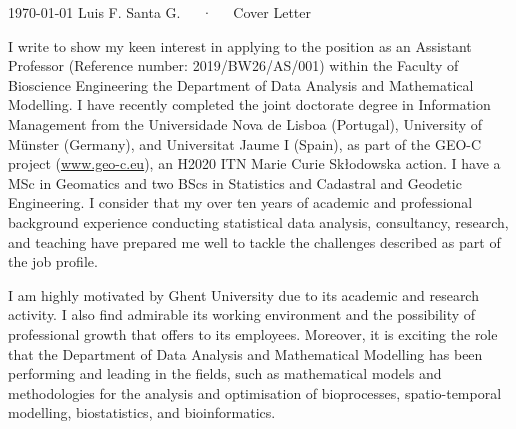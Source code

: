 \documentclass[11pt, a4paper]{awesome-cv}
\begin{document}
\makecvheader[R]

\makecvfooter
  {\today}
    {Luis F. Santa G.~~~·~~~Cover Letter}
  {}

\makelettertitle

\begin{cvletter}
I write to show my keen interest in applying to the position as an Assistant Professor (Reference number: 2019/BW26/AS/001) within the Faculty of Bioscience Engineering the Department of Data Analysis and Mathematical Modelling. I have recently completed the joint doctorate degree in Information Management from the Universidade Nova de Lisboa (Portugal), University of Münster (Germany), and Universitat Jaume I (Spain), as part of the GEO-C project (\url{www.geo-c.eu}), an H2020 ITN Marie Curie Skłodowska action. I have a MSc in Geomatics and two BScs in Statistics and Cadastral and Geodetic Engineering. I consider that my over ten years of academic and professional background experience conducting statistical data analysis, consultancy, research, and teaching have prepared me well to tackle the challenges described as part of the job profile.\par
I am highly motivated by Ghent University due to its academic and research activity. I also find admirable its working environment and the possibility of professional growth that offers to its employees. Moreover, it is exciting the role that the Department of Data Analysis and Mathematical Modelling has been performing and leading in the fields, such as mathematical models and methodologies for the analysis and optimisation of bioprocesses, spatio-temporal modelling, biostatistics, and bioinformatics.\par

\end{cvletter}
\end{document}
